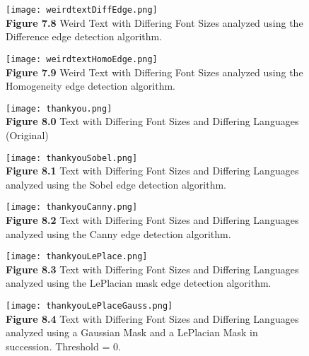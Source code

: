 \documentclass{article}%
\begin{document}
\newpage
\begin{figure}[h]
\centering
\texttt{[image: weirdtextDiffEdge.png]}\\
{\bf Figure 7.8} Weird Text with Differing Font Sizes analyzed using the Difference edge detection algorithm.  
\end{figure}

\newpage
\begin{figure}[h]
\centering
\texttt{[image: weirdtextHomoEdge.png]}\\
{\bf Figure 7.9} Weird Text with Differing Font Sizes analyzed using the Homogeneity edge detection algorithm.  
\end{figure}

\clearpage


\newpage
\begin{figure}[h]
\centering
\texttt{[image: thankyou.png]}\\
{\bf Figure 8.0} Text with Differing Font Sizes and Differing Languages (Original)
\end{figure}


\newpage
\begin{figure}[h]
\centering
\texttt{[image: thankyouSobel.png]}\\
{\bf Figure 8.1} Text with Differing Font Sizes and Differing Languages analyzed using the Sobel edge detection algorithm.   
\end{figure}

\newpage
\begin{figure}[h]
\centering
\texttt{[image: thankyouCanny.png]}\\
{\bf Figure 8.2} Text with Differing Font Sizes and Differing Languages analyzed using the Canny edge detection algorithm.   
\end{figure}

\newpage
\begin{figure}[h]
\centering
\texttt{[image: thankyouLePlace.png]}\\
{\bf Figure 8.3} Text with Differing Font Sizes and Differing Languages analyzed using the LePlacian mask edge detection algorithm.  
\end{figure}

\newpage
\begin{figure}[h]
\centering
\texttt{[image: thankyouLePlaceGauss.png]}\\
{\bf Figure 8.4} Text with Differing Font Sizes and Differing Languages analyzed using a Gaussian Mask and a LePlacian Mask in succession. 
Threshold = 0. 
\end{figure}
\end{document}
